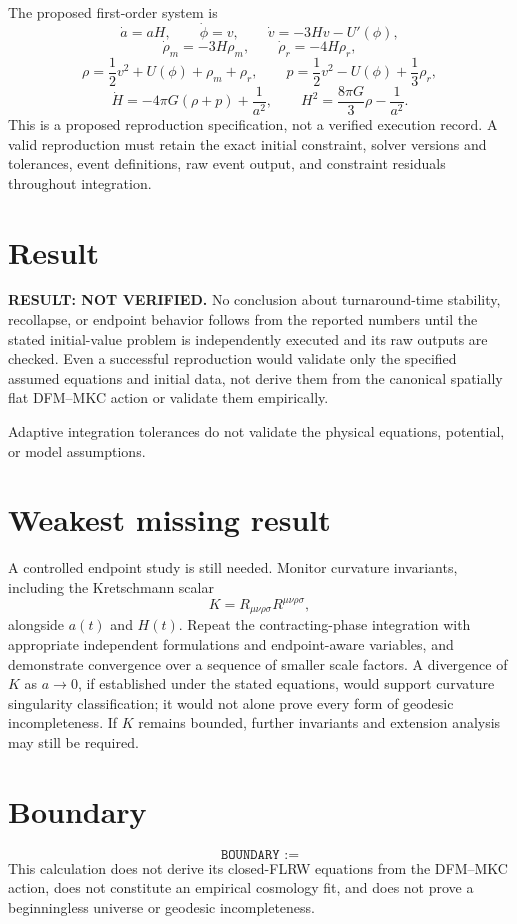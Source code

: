 \documentclass[11pt]{article}
\begin{document}
The proposed first-order system is
\[
\dot a=aH,\qquad \dot\phi=v,\qquad
\dot v=-3Hv-U'(\phi),
\]
\[
\dot\rho_m=-3H\rho_m,\qquad
\dot\rho_r=-4H\rho_r,
\]
\[
\rho=\frac12v^2+U(\phi)+\rho_m+\rho_r,\qquad
p=\frac12v^2-U(\phi)+\frac13\rho_r,
\]
\[
\dot H=-4\pi G(\rho+p)+\frac{1}{a^2},\qquad
H^2=\frac{8\pi G}{3}\rho-\frac{1}{a^2}.
\]
This is a proposed reproduction specification, not a verified execution
record. A valid reproduction must retain the exact initial constraint,
solver versions and tolerances, event definitions, raw event output, and
constraint residuals throughout integration.

\section{Result}
\textbf{RESULT: NOT VERIFIED.} No conclusion about turnaround-time
stability, recollapse, or endpoint behavior follows from the reported numbers
until the stated initial-value problem is independently executed and its raw
outputs are checked. Even a successful reproduction would validate only the
specified assumed equations and initial data, not derive them from the
canonical spatially flat DFM--MKC action or validate them empirically.

Adaptive integration tolerances do not validate the physical equations,
potential, or model assumptions.

\section{Weakest missing result}
A controlled endpoint study is still needed. Monitor curvature invariants,
including the Kretschmann scalar
\[
K=R_{\mu\nu\rho\sigma}R^{\mu\nu\rho\sigma},
\]
alongside $a(t)$ and $H(t)$. Repeat the contracting-phase integration with
appropriate independent formulations and endpoint-aware variables, and
demonstrate convergence over a sequence of smaller scale factors. A divergence
of $K$ as $a\to0$, if established under the stated equations, would support
curvature singularity classification; it would not alone prove every form of
geodesic incompleteness. If $K$ remains bounded, further invariants and
extension analysis may still be required.

\section{Boundary}
\[
\texttt{BOUNDARY :=}
\]
This calculation does not derive its closed-FLRW equations from the DFM--MKC
action, does not constitute an empirical cosmology fit, and does not prove a
beginningless universe or geodesic incompleteness.
\end{document}
